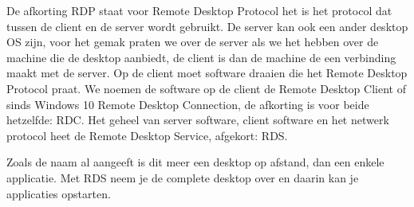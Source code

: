 De afkorting RDP staat voor Remote Desktop Protocol het is het protocol dat tussen de client en de server wordt gebruikt. De server kan ook een ander desktop OS zijn, voor het gemak praten we over de server als we het hebben over de machine die de desktop aanbiedt, de client is dan de machine de een verbinding maakt met de server. Op de client moet software draaien die het Remote Desktop Protocol praat. We noemen de software op de client de Remote Desktop Client of sinds Windows 10 Remote Desktop Connection, de afkorting is voor beide hetzelfde: RDC. Het geheel van server software, client software en het netwerk protocol heet de Remote Desktop Service, afgekort: RDS.

Zoals de naam al aangeeft is dit meer een desktop op afstand, dan een enkele applicatie. Met RDS neem je de complete desktop over en daarin kan je applicaties opstarten.
